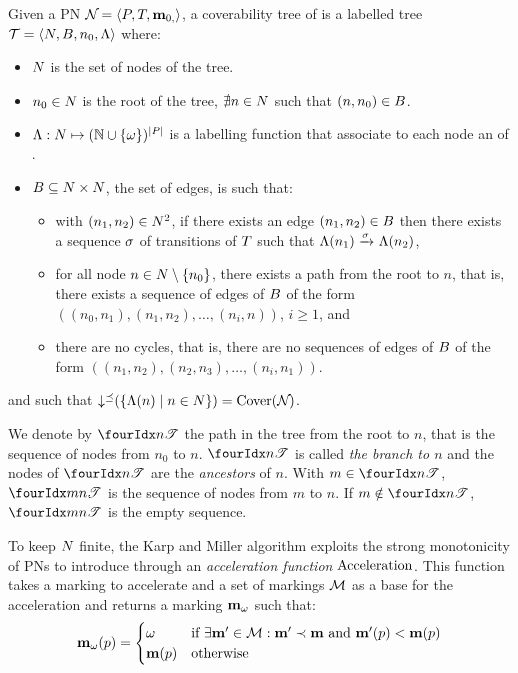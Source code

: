 \begin{defi}
  Given a \ac{PN} $\mathcal{N}_{} = \left\langle P_{}, T_{}, \mathbf{m}_{0,}\right\rangle$, a coverability tree \nameT of \namePN is a labelled tree $\mathcal{T} = \left\langle N, B, n_0, \operatorname{\Lambda}\right\rangle$ where:
  \begin{itemize}
    \item $N$ is the set of nodes of the tree.%

    \item $n_0 \in N$ is the root of the tree,  $\nexists n \in N$ such that $(n, n_0) \in B$.

    \item $\operatorname{\Lambda} : N \mapsto (\mathbb{N} \cup \{\omega\})^{\left|P\right|}$ is a labelling function that associate to each node an \omark of \namePN.

    \item $B \subseteq N \times N$, the set of edges, is such that:
      \begin{itemize}
        \item with $(n_1, n_2) \in N^2$, if there exists an edge $(n_1, n_2) \in B$ then there exists a sequence $\seqt$ of transitions of $T$ such that $\lab{n_1} \fire{\seqt} \lab{n_2}$,
        \item for all node $n \in N \setminus \{n_0\}$, there exists a path from the root to $n$, that is, there exists a sequence of edges of $B$ of the form $((n_0, n_1), (n_1, n_2), \dots, (n_{i}, n))$, $i \geq 1$, and
        \item there are no cycles, that is, there are no sequences of edges of $B$ of the form $((n_1, n_2), (n_2, n_3), \dots, (n_i, n_1))$.
      \end{itemize}
  \end{itemize}
  and such that $\operatorname{\downarrow^\preceq}(\left\{\operatorname{\Lambda}(n) \mid n \in N\right\}) = \operatorname{Cover}(\mathcal{N}_{})$.
\end{defi}

We denote by $\treepath{n}$ the path in the tree from the root to $n$, that is the sequence of nodes from $n_0$ to $n$.
$\treepath{n}$ is called \emph{the branch to $n$} and the nodes of $\treepath{n}$ are the \emph{ancestors} of $n$.
With $m \in \treepath{n}$, $\treepath[m]{n}$ is the sequence of nodes from $m$ to $n$.
If $m \notin \treepath{n}$, $\treepath[m]{n}$ is the empty sequence.

To keep $N$ finite, the Karp and Miller algorithm exploits the strong monotonicity of \acp{PN} to introduce \omarks through an \emph{acceleration function} $\operatorname{Acceleration}$.
This function takes a marking \mar to accelerate and a set of markings $\mathcal{M}$ as a base for the acceleration and returns a marking $\mathbf{m}_\omega$ such that:
\[
  \mathbf{m}_\omega(p) =
  \begin{cases}
    \omega  &\text{if } \exists \mathbf{m}' \in \mathcal{M} : \mathbf{m}' \prec \mathbf{m} \text{ and } \mathbf{m}'(p) < \mathbf{m}(p) \\
    \mathbf{m}(p) &\text{otherwise}
  \end{cases}
\]

